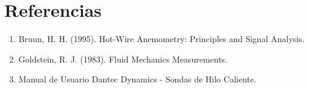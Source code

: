 \documentclass[11pt, a4paper]{article}
\begin{document}
\section{Referencias}
\begin{enumerate}
    \item Bruun, H. H. (1995). Hot-Wire Anemometry: Principles and Signal Analysis.
    \item Goldstein, R. J. (1983). Fluid Mechanics Measurements.
    \item Manual de Usuario Dantec Dynamics - Sondas de Hilo Caliente.
\end{enumerate}
\end{document}

